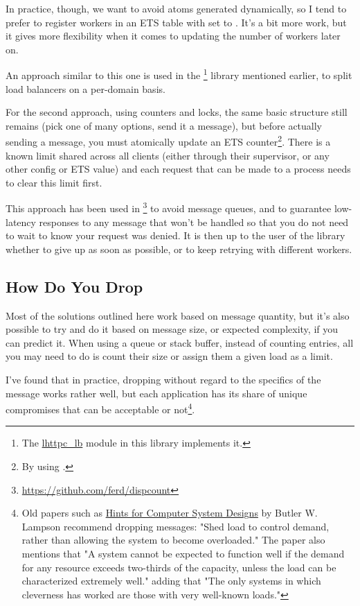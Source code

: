 In practice, though, we want to avoid atoms generated dynamically, so I tend to prefer to register workers in an ETS table with  set to . It's a bit more work, but it gives more flexibility when it comes to updating the number of workers later on.

An approach similar to this one is used in the \footnote{The \href{https://github.com/ferd/lhttpc/blob/master/src/lhttpc\_lb.erl}{lhttpc\_lb} module in this library implements it.} library mentioned earlier, to split load balancers on a per-domain basis.

For the second approach, using counters and locks, the same basic structure still remains (pick one of many options, send it a message), but before actually sending a message, you must atomically update an ETS counter\footnote{By using .}. There is a known limit shared across all clients (either through their supervisor, or any other config or ETS value) and each request that can be made to a process needs to clear this limit first.

This approach has been used in \footnote{\href{https://github.com/ferd/dispcount}{https://github.com/ferd/dispcount}} to avoid message queues, and to guarantee low-latency responses to any message that won't be handled so that you do not need to wait to know your request was denied. It is then up to the user of the library whether to give up as soon as possible, or to keep retrying with different workers.

\subsection{How Do You Drop}

Most of the solutions outlined here work based on message quantity, but it's also possible to try and do it based on message size, or expected complexity, if you can predict it. When using a queue or stack buffer, instead of counting entries, all you may need to do is count their size or assign them a given load as a limit.

I've found that in practice, dropping without regard to the specifics of the message works rather well, but each application has its share of unique compromises that can be acceptable or not\footnote{Old papers such as \href{http://research.microsoft.com/en-us/um/people/blampson/33-hints/webpage.html}{Hints for Computer System Designs} by Butler W. Lampson recommend dropping messages: "Shed load to control demand, rather than allowing the system to become overloaded." The paper also mentions that  "A system cannot be expected to function well if the demand for any resource exceeds two-thirds of the capacity, unless the load can be characterized extremely well." adding that "The only systems in which cleverness has worked are those with very well-known loads."}.

